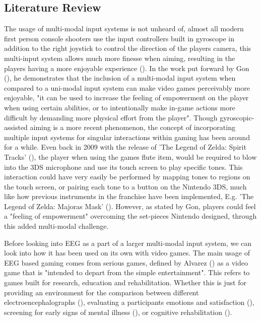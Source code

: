 \documentclass[11pt, a4paper]{article}
\newcommand{\citethis}[1]{(\cite{#1})}
\begin{document}
\subsection{Literature Review}	%
The usage of multi-modal input systems is not unheard of, almost all modern first person console shooters use the input controllers built in gyroscope in addition to the right joystick to control the direction of the players camera, this multi-input system allows much more finesse when aiming, resulting in the players having a more enjoyable experience \citethis{toktacs2019evaluation}. In the work put forward by Gon \citethis{da2014multimodal}, he demonstrates that the inclusion of a multi-modal input system when compared to a uni-modal input system can make video games perceivably more enjoyable, "it can be used to increase the feeling of empowerment on the player when using certain abilities, or to intentionally make in-game actions more difficult by demanding more physical effort from the player". Though gyroscopic-assisted aiming is a more recent phenomenon, the concept of incorporating multiple input systems for singular interactions within gaming has been around for a while. Even back in 2009 with the release of 'The Legend of Zelda: Spirit Tracks' \citethis{thelegendofzelda_spirittracks}, the player when using the games flute item, would be required to blow into the 3DS microphone and use its touch screen to play specific tones. This interaction could have very easily be performed by mapping tones to regions on the touch screen, or pairing each tone to a button on the Nintendo 3DS, much like how previous instruments in the franchise have been implemented, E.g. 'The Legend of Zelda: Majoras Mask' \citethis{thelegendofzelda_majorasmask}. However, as stated by Gon, players could feel a "feeling of empowerment" overcoming the set-pieces Nintendo designed, through this added multi-modal challenge.

\hfill

Before looking into EEG as a part of a larger multi-modal input system, we can look into how it has been used on its own with video games. The main usage of EEG based gaming comes from serious games, defined by Alvarez \citethis{alvarez2011introduction} as a video game that is "intended to depart from the simple entertainment". This refers to games built for research, education and rehabilitation. Whether this is just for providing an environment for the comparison between different electroencephalographs \citethis{liarokapis2014comparing}, evaluating a participants emotions and satisfaction \citethis{vourvopoulos2013brain}, screening for early signs of mental illness \citethis{tarnanas2015comparison}, or cognitive rehabilitation \citethis{alchalcabi2017more}. 
\end{document}

